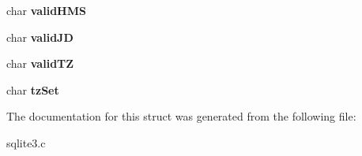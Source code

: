 \begin{DoxyCompactItemize}
\item 
char {\bfseries valid\+H\+MS}\hypertarget{structDateTime_aba26b32c6142cf6bfc09db3088b90add}{}\label{structDateTime_aba26b32c6142cf6bfc09db3088b90add}

\item 
char {\bfseries valid\+JD}\hypertarget{structDateTime_a1962742892150a03dc5d302f43efbb04}{}\label{structDateTime_a1962742892150a03dc5d302f43efbb04}

\item 
char {\bfseries valid\+TZ}\hypertarget{structDateTime_af3dfda2bdbb2183dc1b94f449701b81e}{}\label{structDateTime_af3dfda2bdbb2183dc1b94f449701b81e}

\item 
char {\bfseries tz\+Set}\hypertarget{structDateTime_a1d3f01eb19ad909d0e2a13c25cf4e48e}{}\label{structDateTime_a1d3f01eb19ad909d0e2a13c25cf4e48e}

\end{DoxyCompactItemize}


The documentation for this struct was generated from the following file\+:\begin{DoxyCompactItemize}
\item 
sqlite3.\+c\end{DoxyCompactItemize}
